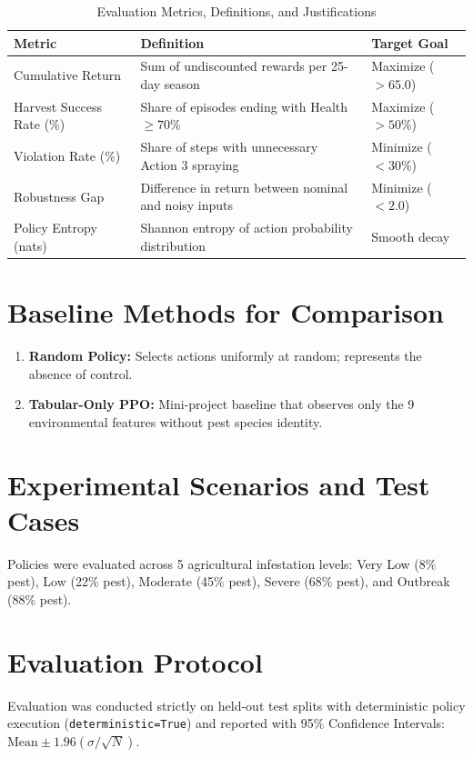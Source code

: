 \documentclass[12pt,a4paper]{report}
\begin{document}
\begin{table}[H]
\centering
\caption{Evaluation Metrics, Definitions, and Justifications}
\label{tab:eval_metrics}
\begin{tabular}{lll}
\toprule
\textbf{Metric} & \textbf{Definition} & \textbf{Target Goal} \\
\midrule
Cumulative Return & Sum of undiscounted rewards per 25-day season & Maximize ($> 65.0$) \\
Harvest Success Rate (\%) & Share of episodes ending with Health $\ge 70\%$ & Maximize ($> 50\%$) \\
Violation Rate (\%) & Share of steps with unnecessary Action 3 spraying & Minimize ($< 30\%$) \\
Robustness Gap & Difference in return between nominal and noisy inputs & Minimize ($< 2.0$) \\
Policy Entropy (nats) & Shannon entropy of action probability distribution & Smooth decay \\
\bottomrule
\end{tabular}
\end{table}

\section{Baseline Methods for Comparison}
\begin{enumerate}
    \item \textbf{Random Policy:} Selects actions uniformly at random; represents the absence of control.
    \item \textbf{Tabular-Only PPO:} Mini-project baseline that observes only the 9 environmental features without pest species identity.
\end{enumerate}

\section{Experimental Scenarios and Test Cases}
Policies were evaluated across 5 agricultural infestation levels: Very Low (8\% pest), Low (22\% pest), Moderate (45\% pest), Severe (68\% pest), and Outbreak (88\% pest).

\section{Evaluation Protocol}
Evaluation was conducted strictly on held-out test splits with deterministic policy execution (\texttt{deterministic=True}) and reported with 95\% Confidence Intervals: $\text{Mean} \pm 1.96 (\sigma / \sqrt{N})$.
\end{document}
